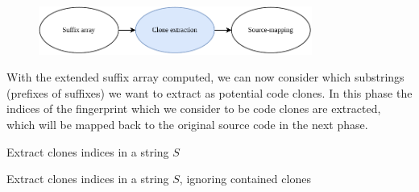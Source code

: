 \begin{figure}[H]
    \begin{center}
        \includegraphics[width=0.8\textwidth]{figures/phases/phases_cloneextraction.drawio.pdf}
    \end{center}
\end{figure}

With the extended suffix array computed, we can now consider which substrings (prefixes of
suffixes) we want to extract as potential code clones. In this phase the indices of the
fingerprint which we consider to be code clones are extracted, which will be mapped back
to the original source code in the next phase.

\begin{algorithm}[t]
  \SetAlgoLined\DontPrintSemicolon

  \vspace{0.5cm}
  \caption{Extract clones indices in a string $S$}
  \label{alg:simplecloneextraction}
\end{algorithm}

\begin{algorithm}[t]
  \SetAlgoLined\DontPrintSemicolon

  \vspace{0.5cm}
  \caption{Extract clones indices in a string $S$, ignoring contained clones}
  \label{alg:cloneextraction}
\end{algorithm}

